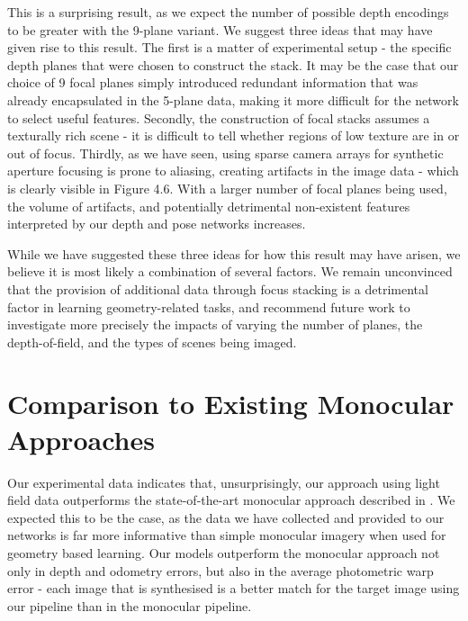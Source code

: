 This is a surprising result, as we expect the number of possible depth encodings to be greater with the 9-plane variant. We suggest three ideas that may have given rise to this result. The first is a matter of experimental setup - the specific depth planes that were chosen to construct the stack. It may be the case that our choice of 9 focal planes simply introduced redundant information that was already encapsulated in the 5-plane data, making it more difficult for the network to select useful features. Secondly, the construction of focal stacks assumes a texturally rich scene - it is difficult to tell whether regions of low texture are in or out of focus. Thirdly, as we have seen, using sparse camera arrays for synthetic aperture focusing is prone to aliasing, creating artifacts in the image data - which is clearly visible in Figure 4.6. With a larger number of focal planes being used, the volume of artifacts, and potentially detrimental non-existent features interpreted by our depth and pose networks increases.

While we have suggested these three ideas for how this result may have arisen, we believe it is most likely a combination of several factors. We remain unconvinced that the provision of additional data through focus stacking is a detrimental factor in learning geometry-related tasks, and recommend future work to investigate more precisely the impacts of varying the number of planes, the depth-of-field, and the types of scenes being imaged.

\section{Comparison to Existing Monocular Approaches}

Our experimental data indicates that, unsurprisingly, our approach using light field data outperforms the state-of-the-art monocular approach described in \cite{zhou2017unsupervised}. We expected this to be the case, as the data we have collected and provided to our networks is far more informative than simple monocular imagery when used for geometry based learning. Our models outperform the monocular approach not only in depth and odometry errors, but also in the average photometric warp error - each image that is synthesised is a better match for the target image using our pipeline than in the monocular pipeline. 

